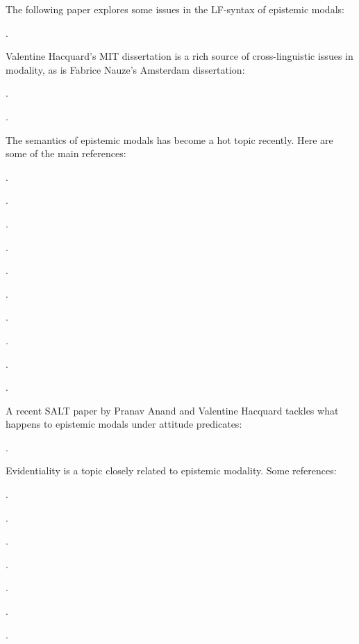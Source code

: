 {The following paper explores some issues in the LF-syntax of epistemic modals:

\begin{bibentrylist}
	\item {}.
\end{bibentrylist}

Valentine Hacquard's MIT dissertation is a rich source of cross-linguistic issues in modality, as is Fabrice Nauze's Amsterdam dissertation:

\begin{bibentrylist}
  \item{}.
  \item {}.
\end{bibentrylist}

The semantics of epistemic modals has become a hot topic recently. Here are some of the main references:

\begin{bibentrylist}
	\item {}.
	\item {}.
	\item {}. 
	\item {}. 
	\item {}. 
	\item {}. 	
	\item {}.
	\item {}.
	\item {}.
	\item {}. 
\end{bibentrylist}

A recent SALT paper by Pranav Anand and Valentine Hacquard tackles what happens to epistemic modals under attitude predicates:

\begin{bibentrylist}
	\item {}.
\end{bibentrylist}

Evidentiality is a topic closely related to epistemic modality. Some references:

\begin{bibentrylist}
  \item {}.
  \item {}.
  \item {}.
  \item {}.
  \item {}.
  \item {}.
  \item {}. 
\end{bibentrylist}

}
